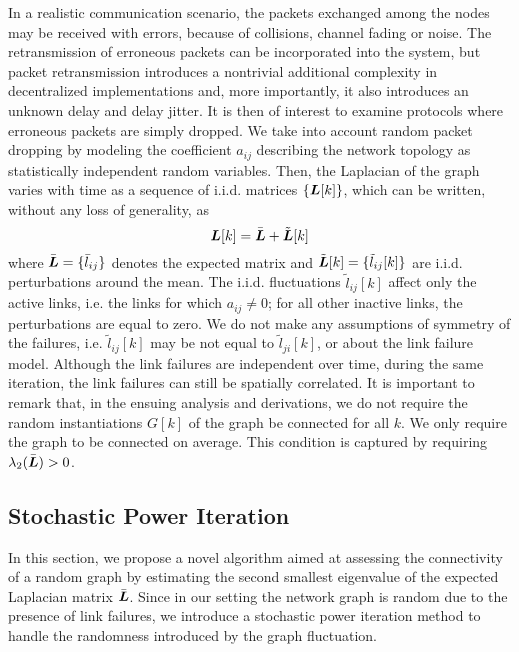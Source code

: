 \documentclass[10pt,twocolumn]{IEEEtran}
\def\bL{\mbox{\boldmath $L$}}
\begin{document}
 In a realistic communication scenario, the packets exchanged among the nodes may be received with errors, because of collisions, channel fading or noise. The retransmission of erroneous packets can be incorporated into the system, but packet retransmission introduces a nontrivial additional complexity in decentralized implementations and, more importantly, it also introduces an unknown delay and delay jitter. It is then of interest to examine protocols where erroneous packets are simply dropped. We take into account random packet dropping by modeling the coefficient $a_{ij}$ describing the network topology as statistically independent random variables. Then, the Laplacian of the graph varies with time as a sequence of i.i.d. matrices $\{\bL[k]\}$, which can be written, without any loss of generality, as
\begin{equation}\label{RandomLaplacian}
 \bL[k] =\bar{\bL} + \tilde{\bL}[k]
\end{equation}
where $\bar{\bL}=\{\bar{l}_{ij}\}$ denotes the expected matrix and $\tilde{\bL}[k]=\{\tilde{l}_{ij}[k]\}$ are i.i.d. perturbations around the mean.
The i.i.d. fluctuations $\tilde{l}_{ij}[k]$ affect only the active links, i.e. the links for which $a_{ij}\neq 0$; for all other inactive links, the perturbations are equal to zero. We do not make any assumptions of symmetry of the failures, i.e. $\tilde{l}_{ij}[k]$ may be not equal to $\tilde{l}_{ji}[k]$, or about the link failure model. Although the link failures are independent over time, during the same iteration, the link failures can still be spatially correlated. It is important to remark that, in the ensuing analysis and derivations, we do not require the random instantiations $G[k]$ of the graph be connected for all $k$. We only require the graph to be connected on average. This condition is captured by requiring $\lambda_2(\bar{\bL})>0$.

\subsection{Stochastic Power Iteration}

In this section, we propose a novel algorithm aimed at assessing the connectivity of a random graph by estimating the second smallest eigenvalue of the expected Laplacian matrix $\bar{\bL}$. Since in our setting the network graph is random due to the presence of link failures, we introduce a stochastic power iteration method to handle the randomness introduced by the graph fluctuation.
\end{document}
